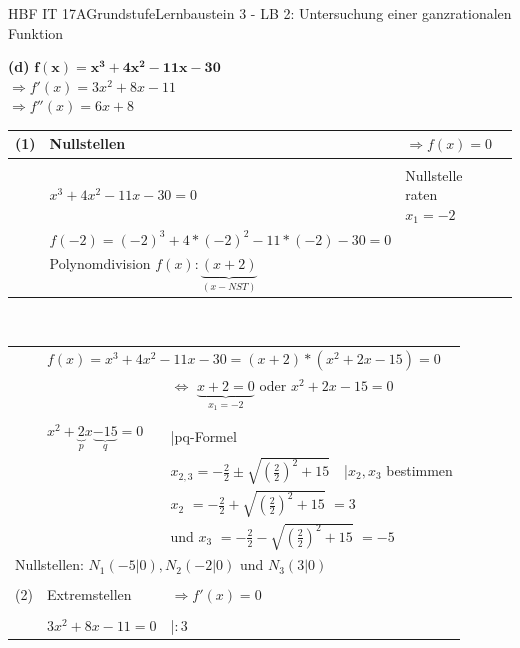 \documentclass[oneside,openany,headings=optiontotoc,11pt,numbers=noenddot]{scrreprt}
\begin{document}
\begin{worksheet}{HBF IT 17A}{Grundstufe}{Lernbaustein 3 - LB 2: Untersuchung einer ganzrationalen Funktion}
\begin{framed}
		\end{framed}
		\newpage
		\begin{framed}
			\noindent
			\textbf{(d)} \(\mathbf{f(x) = x^3 +4x^2-11x-30}\)\\
			\(\Rightarrow f'(x) = 3x^2 +8x-11\)\\
			\(\Rightarrow f''(x) = 6x +8\)\\
			\par\noindent
			\begin{tabularx}{\textwidth}{lXXl}
				(1) & Nullstellen & \(\Rightarrow f(x) = 0\)\\
				\hline\\
				& \(x^3 +4x^2-11x-30 = 0\) & Nullstelle raten \colorbox{green!10}{\(x_1 = -2\)}\\
				& \(f(-2) = (-2)^3 +4*(-2)^2-11*(-2)-30 = 0\)\\
				& Polynomdivision \(f(x):\underbrace{(x+2)}_{(x-NST)}\)\\
			\end{tabularx}
			\\
			\begin{tabularx}{\textwidth}{lXXl}
				& \multicolumn{3}{l}{\(f(x) = x^3 +4x^2-11x-30 = (x+2)*(x^2+2x-15) = 0\)}\\
				& & \multicolumn{2}{l}{\(\Leftrightarrow\) \colorbox{green!10}{\(\underbrace{x+2=0}_{x_1=-2}\)} oder \(x^2 +2x-15 = 0\)}\\
				\cline{1-2}\\
				& \(x^2 +\underbrace{2}_{p}x \underbrace{-15}_{q} = 0\) & |pq-Formel\\
				& & \(x_{2,3} = -\frac{2}{2} \pm \sqrt{\left(\frac{2}{2}\right)^2 +15}\) & |\(x_2,x_3\) bestimmen\\
				& & \multicolumn{2}{l}{\colorbox{green!10}{\(x_2\)} \(= -\frac{2}{2} + \sqrt{\left(\frac{2}{2}\right)^2 +15}\) \colorbox{green!10}{\(= 3\)}}\\
				& & \multicolumn{2}{l}{und \colorbox{green!10}{\(x_3\)} \(= -\frac{2}{2} - \sqrt{\left(\frac{2}{2}\right)^2 +15}\) \colorbox{green!10}{\(=-5\)}}\\
				\multicolumn{4}{l}{Nullstellen: \colorbox{blue!5}{\(N_1(-5|0), N_2(-2|0)\)} und \colorbox{blue!5}{\(N_3(3|0)\)}}\\
				\hline\hline\\
				(2) & Extremstellen & \(\Rightarrow f'(x) = 0\)\\
				\hline\\
				& \(3x^2 +8x-11 = 0\) & |\(:3\)\\

\end{tabularx}
\end{framed}
\end{worksheet}
\end{document}
